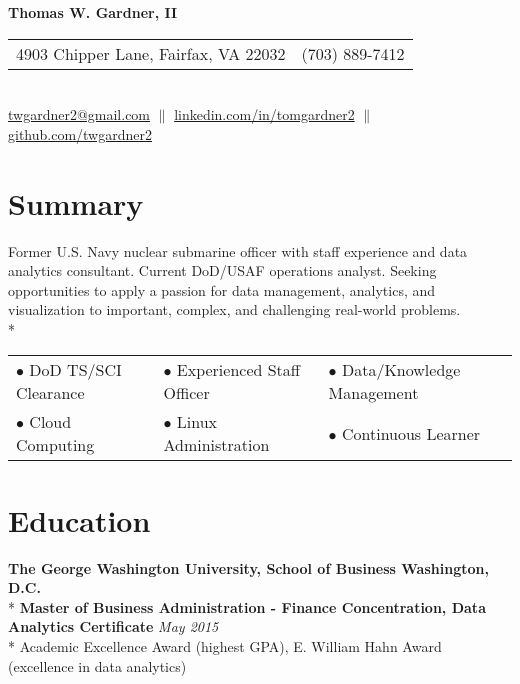 \documentclass{article}
\begin{document}
\begin{center} 
\textbf{\LARGE Thomas W. Gardner, II} \\
\begin{tabular}{@{} l l}
	4903 Chipper Lane, Fairfax, VA 22032 	& (703) 889-7412 \\
\end{tabular} \\
\href{mailto:twgardner2@gmail.com}{twgardner2@gmail.com} $\parallel$ \href{https://www.linkedin.com/in/tomgardner2}{linkedin.com/in/tomgardner2} $\parallel$ \href{https://www.github.com/twgardner2}{github.com/twgardner2} \\
\end{center}
\section{Summary}
Former U.S. Navy nuclear submarine officer with staff experience and data analytics consultant. Current DoD/USAF operations analyst. Seeking opportunities to apply a passion for data management, analytics, and visualization to important, complex, and challenging real-world problems. \\*
\begin{minipage}{\textwidth}

\vspace{0.25cm}
\centering
\begin{tabular}{@{}p{5cm} p{5cm} p{5cm}}
	$\bullet$ DoD TS/SCI Clearance	& $\bullet$ Experienced Staff Officer	& $\bullet$ Data/Knowledge Management \\*
	$\bullet$ Cloud Computing 		& $\bullet$ Linux Administration 		& $\bullet$ Continuous Learner \\*
\end{tabular}
\end{minipage}

\section{Education} 

\textbf{The George Washington University, School of Business \hfill Washington, D.C.} \\*
\textbf{Master of Business Administration - Finance Concentration, Data Analytics Certificate} \hfill \textit{May 2015} \\*
\textendash Academic Excellence Award (highest GPA), E. William Hahn Award (excellence in data analytics)\\
\end{document}
